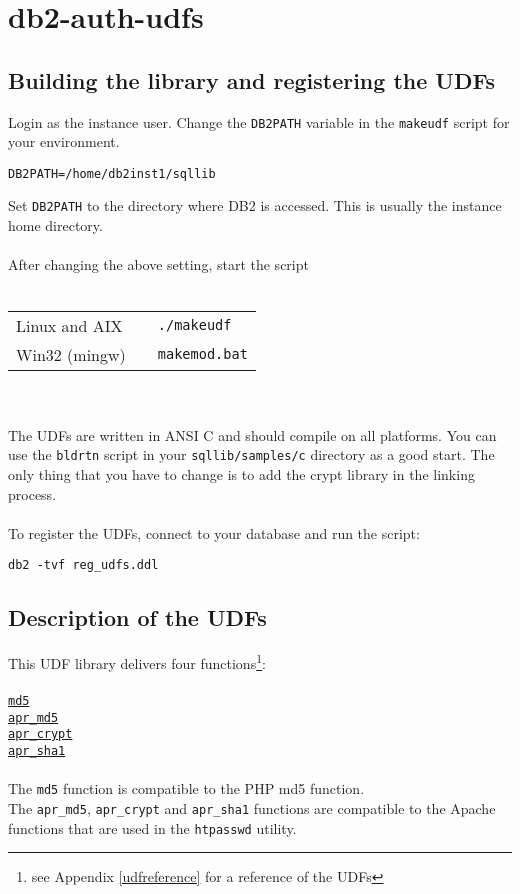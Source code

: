 \documentclass[11pt,a4paper]{article}
\begin{document}
\section{db2-auth-udfs}
\subsection{Building the library and registering the UDFs}
Login as the instance user. Change the {\tt DB2PATH} variable in the {\tt makeudf} script for your environment.
\begin{verbatim}
DB2PATH=/home/db2inst1/sqllib
\end{verbatim}
Set {\tt DB2PATH} to the directory where DB2 is accessed. This is usually the instance home directory.\\
\\
After changing the above setting, start the script\\
\\
\begin{tabular}{@{} lll @{}}
Linux and AIX & & {\tt ./makeudf}\\
Win32 (mingw) & & {\tt makemod.bat}\\
\end{tabular}
\\\\
The UDFs are written in ANSI C and should compile on all platforms.
You can use the {\tt bldrtn} script in your {\tt sqllib/samples/c} directory as a good start.
The only thing that you have to change is to add the crypt library in the linking process.\\
\\
To register the UDFs, connect to your database and run the script:
\begin{verbatim}
db2 -tvf reg_udfs.ddl
\end{verbatim}
\subsection{Description of the UDFs}
This UDF library delivers four functions\footnote{see Appendix \ref{udfreference} for a reference of the UDFs}:\\
\\
\hyperlink{hmd5}{\tt md5}\\
\hyperlink{haprmd5}{\tt apr\_md5}\\
\hyperlink{haprcrypt}{\tt apr\_crypt}\\
\hyperlink{haprsha1}{\tt apr\_sha1}\\
\\
The {\tt md5} function is compatible to the PHP md5 function.\\
The {\tt apr\_md5}, {\tt apr\_crypt} and {\tt apr\_sha1} functions are compatible to the Apache functions that are used in the {\tt htpasswd} utility.
\newpage
\end{document}
